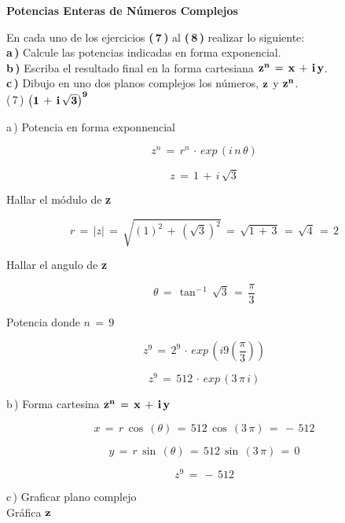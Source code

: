 \documentclass[a4paper,11pt,openany]{book}
\begin{document}
\begin{center}
\textbf{Potencias Enteras de Números Complejos}
\end{center}

En cada uno de los ejercicios \textbf{(\,7\,)} al \textbf{(\,8\,)} realizar lo siguiente:\\

\textbf{a\,)} Calcule las potencias indicadas en forma exponencial.\\

\textbf{b\,)} Escriba el resultado final en la forma cartesiana $\bf{z^{n}\,=\,x\,+\,i\,y}$.\\

\textbf{c\,)} Dibujo en uno dos planos complejos los números, $\bf{z}$ y $\bf{z^{n}}$.\\

\textcolor{ao(english)}{(\,7\,)} $\bf{\left(1\,+\,i\,\sqrt{3}\right)^{9}}$

\textcolor{ao(english)}{a\,)} Potencia en forma exponnencial

$$z^{n}\,=\,r^{n}\,\cdot\,exp\,(i\,n\,\theta)$$

$$z\,=\,1\,+\,i\,\sqrt{3}$$

\textcolor{ao(english)}{} Hallar el módulo de \textbf{z}

$$r\,=\,|z|\,=\,\sqrt{(1)^{2}\,+\,\left(\sqrt{3}\right)^{2}}\,=\,\sqrt{1\,+\,3}\,=\,\sqrt{4}\,=\,2$$

\textcolor{ao(english)}{} Hallar el angulo de \textbf{z}

$$\theta\,=\,\tan^{-\,1}\,\sqrt{3}\,=\,\dfrac{\pi}{3}$$

\textcolor{ao(english)}{} Potencia donde $n\,=\,9$

$$z^{9}\,=\,2^{9}\,\cdot\,exp\,\left(i9\left(\dfrac{\pi}{3}\right)\right)$$

$$z^{9}\,=\,512\,\cdot\,exp\,\left(3\,\pi\,i\right)$$

\textcolor{ao(english)}{b\,)} Forma cartesina $\bf{z^{n}\,=\,x\,+\,i\,y}$

$$x\,=\,r\,\cos\,(\theta)\,=\,512\,\cos\,(3\,\pi)\,=\,-\,512$$

$$y\,=\,r\,\sin\,(\theta)\,=\,512\,\sin\,(3\,\pi)\,=\,0$$

$$z^{9}\,=\,-\,512$$

\textcolor{ao(english)}{c\,)} Graficar plano complejo\\

\textcolor{ao(english)}{} Gráfica $\bf{z}$
\end{document}

